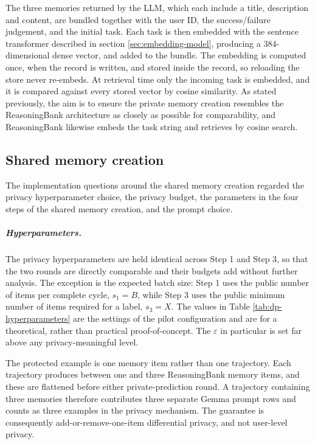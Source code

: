 The three memories returned by the LLM, which each include a title, description and content, are bundled together with the user ID, the success/failure judgement, and the initial task. Each task is then embedded with the sentence transformer described in section \ref{sec:embedding-model}, producing a 384-dimensional dense vector, and added to the bundle. The embedding is computed once, when the record is written, and stored inside the record, so reloading the store never re-embeds. At retrieval time only the incoming task is embedded, and it is compared against every stored vector by cosine similarity. As stated previously, the aim is to ensure the private memory creation resembles the ReasoningBank architecture as closely as possible for comparability, and ReasoningBank likewise embeds the task string and retrieves by cosine search.

\subsection{Shared memory creation}
The implementation questions around the shared memory creation regarded the privacy hyperparameter choice, the privacy budget, the parameters in the four steps of the shared memory creation, and the prompt choice.

\subparagraph{Hyperparameters.} The privacy hyperparameters are held identical across Step 1 and Step 3, so that the two rounds are directly comparable and their budgets add without further analysis. The exception is the expected batch size: Step 1 uses the public number of items per complete cycle, $s_1=B$, while Step 3 uses the public minimum number of items required for a label, $s_3=X$. The values in Table \ref{tab:dp-hyperparameters} are the settings of the pilot configuration and are for a theoretical, rather than practical proof-of-concept. The $\varepsilon$ in particular is set far above any privacy-meaningful level.

The protected example is one memory item rather than one trajectory. Each trajectory produces between one and three ReasoningBank memory items, and these are flattened before either private-prediction round. A trajectory containing three memories therefore contributes three separate Gemma prompt rows and counts as three examples in the privacy mechanism. The guarantee is consequently add-or-remove-one-item differential privacy, and not user-level privacy.

